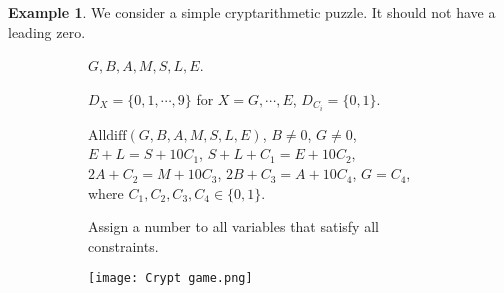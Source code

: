 \documentclass{article}
\theoremstyle{definition}
\newtheorem{example}{Example}[definition]
\begin{document}
\begin{example}
	\label{Cryptarithmetic puzzle}
	We consider a simple cryptarithmetic puzzle. It should not have a leading zero.
	\begin{figure}[h]
		\begin{subfigure}[h]{0.69\textwidth}
			\begin{description}[style=nextline]
				\item[Variables:] $G,B,A,M,S,L,E$.
				\item[Domain:] $D_{X}=\{0,1,\cdots,9\}$ for $X=G,\cdots,E$, $D_{C_{i}}=\{0,1\}$.
				\item[Constraint:] $\text{Alldiff}(G,B,A,M,S,L,E)$, $B\neq 0$, $G\neq 0$,\\
				$E+L=S+10C_{1}$, $S+L+C_{1}=E+10C_{2}$,\\
				$2A+C_{2}=M+10C_{3}$, $2B+C_{3}=A+10C_{4}$, $G=C_{4}$,\\
				where $C_{1},C_{2},C_{3},C_{4}\in\{0,1\}$.
				\item[Goal:] Assign a number to all variables that satisfy all constraints.
			\end{description}
		\end{subfigure}
		\begin{subfigure}[h]{0.3\textwidth}
			\texttt{[image: Crypt game.png]}
		\end{subfigure}
	\end{figure}
\end{example}
\end{document}
